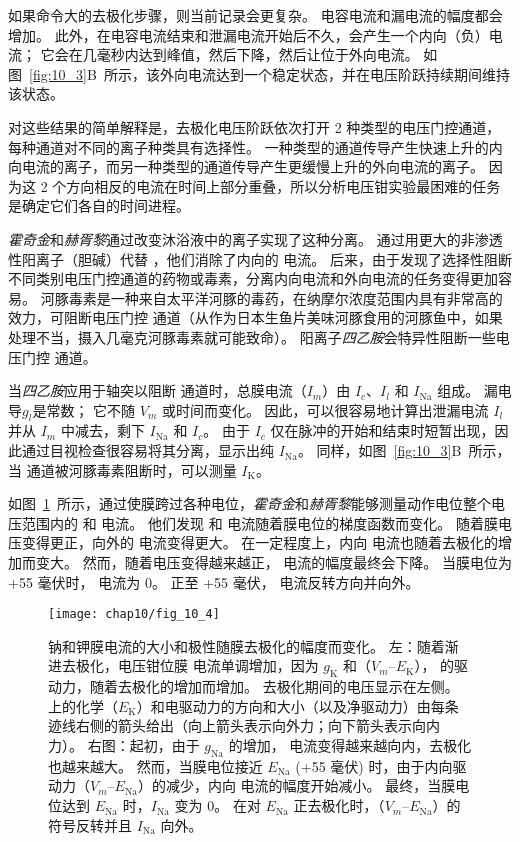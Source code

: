 如果命令大的去极化步骤，则当前记录会更复杂。
电容电流和漏电流的幅度都会增加。
此外，在电容电流结束和泄漏电流开始后不久，会产生一个内向（负）电流；
它会在几毫秒内达到峰值，然后下降，然后让位于外向电流。
如图~\ref{fig:10_3}B~所示，该外向电流达到一个稳定状态，并在电压阶跃持续期间维持该状态。


对这些结果的简单解释是，去极化电压阶跃依次打开 2 种类型的电压门控通道，每种通道对不同的离子种类具有选择性。
一种类型的通道传导产生快速上升的内向电流的离子，而另一种类型的通道传导产生更缓慢上升的外向电流的离子。
因为这 2 个方向相反的电流在时间上部分重叠，所以分析电压钳实验最困难的任务是确定它们各自的时间进程。


\textit{霍奇金}和\textit{赫胥黎}通过改变沐浴液中的离子实现了这种分离。
通过用更大的非渗透性阳离子（胆碱）代替 ，他们消除了内向的  电流。
后来，由于发现了选择性阻断不同类别电压门控通道的药物或毒素，分离内向电流和外向电流的任务变得更加容易。
河豚毒素是一种来自太平洋河豚的毒药，在纳摩尔浓度范围内具有非常高的效力，可阻断电压门控  通道（从作为日本生鱼片美味河豚食用的河豚鱼中，如果处理不当，摄入几毫克河豚毒素就可能致命）。
阳离子\textit{四乙胺}会特异性阻断一些电压门控  通道。


当\textit{四乙胺}应用于轴突以阻断  通道时，总膜电流（$I_m$）由 $I_c$、$I_l$ 和 $I_\text{Na}$ 组成。
漏电导$g_l$是常数；
它不随 $V_m$ 或时间而变化。
因此，可以很容易地计算出泄漏电流 $I_l$ 并从 $I_m$ 中减去，剩下 $I_\text{Na}$ 和 $I_c$。
由于 $I_c$ 仅在脉冲的开始和结束时短暂出现，因此通过目视检查很容易将其分离，显示出纯 $I_\text{Na}$。
同样，如图~\ref{fig:10_3}B~所示，当  通道被河豚毒素阻断时，可以测量 $I_\text{K}$。


如图~\ref{fig:10_4}~所示，通过使膜跨过各种电位，\textit{霍奇金}和\textit{赫胥黎}能够测量动作电位整个电压范围内的  和  电流。
他们发现  和  电流随着膜电位的梯度函数而变化。
随着膜电压变得更正，向外的  电流变得更大。
在一定程度上，内向  电流也随着去极化的增加而变大。
然而，随着电压变得越来越正， 电流的幅度最终会下降。
当膜电位为 +55 毫伏时， 电流为 0。
正至 +55 毫伏， 电流反转方向并向外。


\begin{figure}[htbp]
	\centering
	\texttt{[image: chap10/fig\_10\_4]}
	\caption{钠和钾膜电流的大小和极性随膜去极化的幅度而变化。
		左：随着渐进去极化，电压钳位膜  电流单调增加，因为 $g_\text{K}$ 和（$V_m – E_\text{K}$）， 的驱动力，随着去极化的增加而增加。
		去极化期间的电压显示在左侧。
		 上的化学（$E_\text{K}$）和电驱动力的方向和大小（以及净驱动力）由每条迹线右侧的箭头给出（向上箭头表示向外力；向下箭头表示向内力）。
		右图：起初，由于 $g_\text{Na}$ 的增加， 电流变得越来越向内，去极化也越来越大。
		然而，当膜电位接近 $E_{\text{Na}}$ (+55 毫伏) 时，由于内向驱动力（$V_m – E_{\text{Na}}$）的减少，内向  电流的幅度开始减小。
		最终，当膜电位达到 $E_{\text{Na}}$ 时，$I_\text{Na}$ 变为 0。
		在对 $E_{\text{Na}}$ 正去极化时，（$V_m – E_{\text{Na}}$）的符号反转并且 $I_\text{Na}$ 向外。}
	\label{fig:10_4}
\end{figure}


